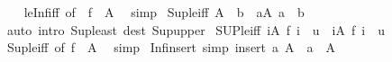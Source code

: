 \begin{isabellebody}
%
\isadelimproof
\ \ %
\endisadelimproof
%
\isatagproof
{}\isamarkupfalse%
\ le{\isacharunderscore}{\kern0pt}Inf{\isacharunderscore}{\kern0pt}iff\ {\isacharbrackleft}{\kern0pt}of\ {\isacharunderscore}{\kern0pt}\ {\isachardoublequoteopen}f\ {\isacharbackquote}{\kern0pt}\ A{\isachardoublequoteclose}{\isacharbrackright}{\kern0pt}\ \isamarkupfalse%
\ simp%
\endisatagproof
{\isafoldproof}%
%
\isadelimproof
\isanewline
%
\endisadelimproof
\isanewline
{}\isamarkupfalse%
\ Sup{\isacharunderscore}{\kern0pt}le{\isacharunderscore}{\kern0pt}iff{\isacharcolon}{\kern0pt}\ {\isachardoublequoteopen}{\isasymSqunion}A\ {\isasymle}\ b\ {\isasymlongleftrightarrow}\ {\isacharparenleft}{\kern0pt}{\isasymforall}a{\isasymin}A{\isachardot}{\kern0pt}\ a\ {\isasymle}\ b{\isacharparenright}{\kern0pt}{\isachardoublequoteclose}\isanewline
%
\isadelimproof
\ \ %
\endisadelimproof
%
\isatagproof
{}\isamarkupfalse%
\ {\isacharparenleft}{\kern0pt}auto\ intro{\isacharcolon}{\kern0pt}\ Sup{\isacharunderscore}{\kern0pt}least\ dest{\isacharcolon}{\kern0pt}\ Sup{\isacharunderscore}{\kern0pt}upper{\isacharparenright}{\kern0pt}%
\endisatagproof
{\isafoldproof}%
%
\isadelimproof
\isanewline
%
\endisadelimproof
\isanewline
{}\isamarkupfalse%
\ SUP{\isacharunderscore}{\kern0pt}le{\isacharunderscore}{\kern0pt}iff{\isacharcolon}{\kern0pt}\ {\isachardoublequoteopen}{\isacharparenleft}{\kern0pt}{\isasymSqunion}i{\isasymin}A{\isachardot}{\kern0pt}\ f\ i{\isacharparenright}{\kern0pt}\ {\isasymle}\ u\ {\isasymlongleftrightarrow}\ {\isacharparenleft}{\kern0pt}{\isasymforall}i{\isasymin}A{\isachardot}{\kern0pt}\ f\ i\ {\isasymle}\ u{\isacharparenright}{\kern0pt}{\isachardoublequoteclose}\isanewline
%
\isadelimproof
\ \ %
\endisadelimproof
%
\isatagproof
{}\isamarkupfalse%
\ Sup{\isacharunderscore}{\kern0pt}le{\isacharunderscore}{\kern0pt}iff\ {\isacharbrackleft}{\kern0pt}of\ {\isachardoublequoteopen}f\ {\isacharbackquote}{\kern0pt}\ A{\isachardoublequoteclose}{\isacharbrackright}{\kern0pt}\ \isamarkupfalse%
\ simp%
\endisatagproof
{\isafoldproof}%
%
\isadelimproof
\isanewline
%
\endisadelimproof
\isanewline
{}\isamarkupfalse%
\ Inf{\isacharunderscore}{\kern0pt}insert\ {\isacharbrackleft}{\kern0pt}simp{\isacharbrackright}{\kern0pt}{\isacharcolon}{\kern0pt}\ {\isachardoublequoteopen}{\isasymSqinter}{\isacharparenleft}{\kern0pt}insert\ a\ A{\isacharparenright}{\kern0pt}\ {\isacharequal}{\kern0pt}\ a\ {\isasymsqinter}\ {\isasymSqinter}A{\isachardoublequoteclose}\isanewline
%
\isadelimproof

\end{isabellebody}
